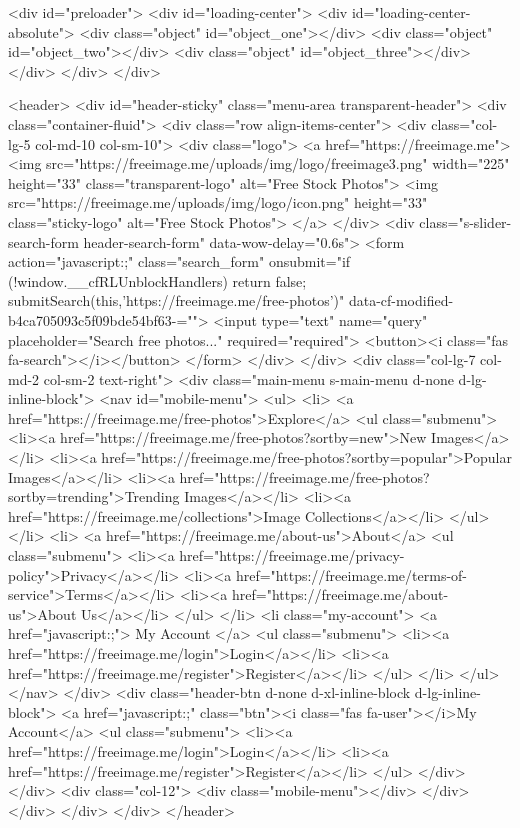 <div id="preloader">
<div id="loading-center">
<div id="loading-center-absolute">
<div class="object" id="object_one"></div>
<div class="object" id="object_two"></div>
<div class="object" id="object_three"></div>
</div>
</div>
</div>


<header>
<div id="header-sticky" class="menu-area transparent-header">
<div class="container-fluid">
<div class="row align-items-center">
<div class="col-lg-5 col-md-10 col-sm-10">
<div class="logo">
<a href="https://freeimage.me">
<img src="https://freeimage.me/uploads/img/logo/freeimage3.png" width="225" height="33" class="transparent-logo" alt="Free Stock Photos">
<img src="https://freeimage.me/uploads/img/logo/icon.png" height="33" class="sticky-logo" alt="Free Stock Photos">
</a>
</div>
<div class="s-slider-search-form header-search-form" data-wow-delay="0.6s">
<form action="javascript:;" class="search_form" onsubmit="if (!window.__cfRLUnblockHandlers) return false; submitSearch(this,'https://freeimage.me/free-photos')" data-cf-modified-b4ca705093c5f09bde54bf63-="">
<input type="text" name="query" placeholder="Search free photos..." required="required">
<button><i class="fas fa-search"></i></button>
</form>
</div>
</div>
<div class="col-lg-7 col-md-2 col-sm-2 text-right">
<div class="main-menu s-main-menu d-none d-lg-inline-block">
<nav id="mobile-menu">
<ul>
<li>
<a href="https://freeimage.me/free-photos">Explore</a>
<ul class="submenu">
<li><a href="https://freeimage.me/free-photos?sortby=new">New Images</a></li>
<li><a href="https://freeimage.me/free-photos?sortby=popular">Popular Images</a></li>
<li><a href="https://freeimage.me/free-photos?sortby=trending">Trending Images</a></li>
<li><a href="https://freeimage.me/collections">Image Collections</a></li>
</ul>
</li>
<li>
<a href="https://freeimage.me/about-us">About</a>
<ul class="submenu">
<li><a href="https://freeimage.me/privacy-policy">Privacy</a></li>
<li><a href="https://freeimage.me/terms-of-service">Terms</a></li>
<li><a href="https://freeimage.me/about-us">About Us</a></li>
</ul>
</li>
<li class="my-account">
<a href="javascript:;">
My Account
</a>
<ul class="submenu">
<li><a href="https://freeimage.me/login">Login</a></li>
<li><a href="https://freeimage.me/register">Register</a></li>
</ul>
</li>
</ul>
</nav>
</div>
<div class="header-btn d-none d-xl-inline-block d-lg-inline-block">
<a href="javascript:;" class="btn"><i class="fas fa-user"></i>My Account</a>
<ul class="submenu">
<li><a href="https://freeimage.me/login">Login</a></li>
<li><a href="https://freeimage.me/register">Register</a></li>
</ul>
</div>
</div>
<div class="col-12">
<div class="mobile-menu"></div>
</div>
</div>
</div>
</div>
</header> 

